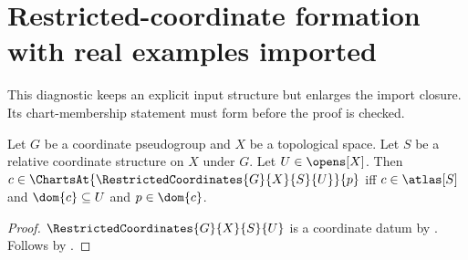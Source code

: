 \section{Restricted-coordinate formation with real examples imported}




This diagnostic keeps an explicit input structure but enlarges the import
closure. Its chart-membership statement must form before the proof is checked.

\begin{theorem}\label{imported_restricted_charts_at}
    Let $G$ be a coordinate pseudogroup and $X$ be a topological space.
    Let $S$ be a relative coordinate structure on $X$ under $G$.
    Let $U\in\opens[X]$.
    Then $c\in\ChartsAt{\RestrictedCoordinates{G}{X}{S}{U}}{p}$ iff
        $c\in\atlas[S]$ and $\dom{c}\subseteq U$ and $p\in\dom{c}$.
\end{theorem}
\begin{proof}
    $\RestrictedCoordinates{G}{X}{S}{U}$ is a coordinate datum by
        .
    Follows by .
\end{proof}
